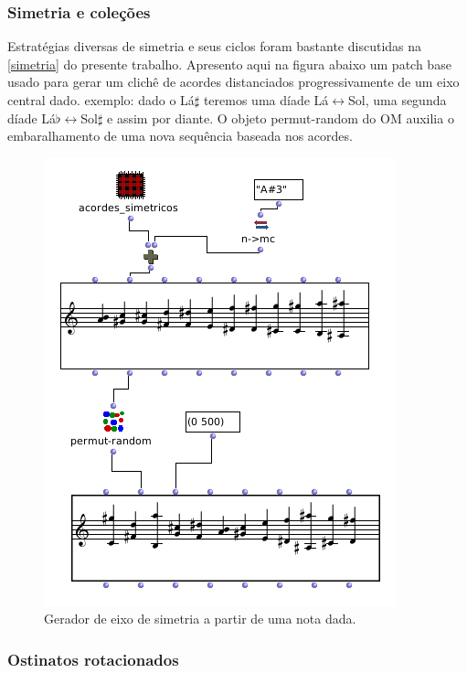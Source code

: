 \documentclass[
	12pt,				%
	openright,			%
	twoside,			%
	a4paper,			%
	english,			%
	french,				%
	spanish,			%
	brazil				%
	]{abntex2}
\begin{document}
\subsubsection{Simetria e coleções }

Estratégias diversas de simetria e seus ciclos foram bastante discutidas na \autoref{simetria} do presente trabalho. Apresento aqui na figura abaixo um patch base usado para gerar um clichê de acordes distanciados progressivamente de um eixo central dado. exemplo: dado o Lá$\sharp$ teremos uma díade Lá$\leftrightarrow$Sol, uma segunda díade Lá$\flat \leftrightarrow$Sol$\sharp$ e assim por diante. O objeto permut-random do OM auxilia o embaralhamento de uma nova sequência baseada nos acordes.

\begin{figure}[!h]
	\caption{\label{fig_grafico}Gerador de eixo de simetria a partir de uma nota dada. }
	\begin{center}
	    \includegraphics[scale=0.6]{OMPD/simetricos01.png}
	\end{center}
\end{figure}

\subsubsection{Ostinatos rotacionados}
\end{document}
